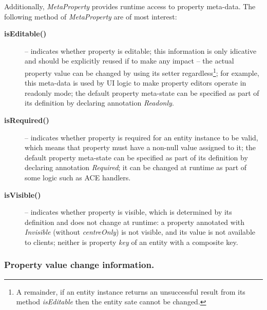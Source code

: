   Additionally, \emph{MetaProperty} provides runtime access to property meta-data.
  The following method of \emph{MetaProperty} are of most interest:
  \begin{description}
    \item[\textbf{isEditable()}] -- indicates whether property is editable; this information is only idicative and should be explicitly reused if to make any impact -- the actual property value can be changed by using its setter regardless\footnote{A remainder, if an entity instance returns an unsuccessful result from its method \emph{isEditable} then the entity sate cannot be changed.}; for example, this meta-data is used by UI logic to make property editors operate in readonly mode; the default property meta-state can be specified as part of its definition by declaring annotation \emph{Readonly}.
    \item[\textbf{isRequired()}] -- indicates whether property is required for an entity instance to be valid, which means that property must have a non-null value assigned to it; the default property meta-state can be specified as part of its definition by declaring annotation \emph{Required}; it can be changed at runtime as part of some logic such as ACE handlers.
    \item[\textbf{isVisible()}] -- indicates whether property is visible, which is determined by its definition and does not change at runtime: a property annotated with \emph{Invisible} (without \emph{centreOnly}) is not visible, and its value is not available to clients; neither is property \emph{key} of an entity with a composite key.
  \end{description}  


  \subsubsection*{Property value change information.}
  
